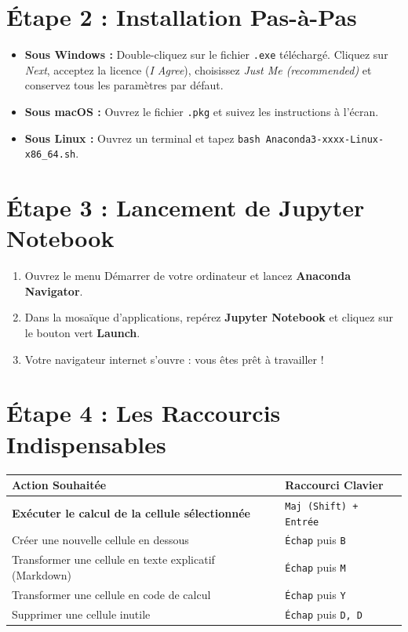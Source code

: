 \documentclass[11pt,a4paper]{article}
\begin{document}
\section*{\faCogs\hspace{0.5em}Étape 2 : Installation Pas-à-Pas}
\begin{itemize}
  \item \textbf{Sous Windows :} Double-cliquez sur le fichier \texttt{.exe} téléchargé. Cliquez sur \textit{Next}, acceptez la licence (\textit{I Agree}), choisissez \textit{Just Me (recommended)} et conservez tous les paramètres par défaut.
  \item \textbf{Sous macOS :} Ouvrez le fichier \texttt{.pkg} et suivez les instructions à l'écran.
  \item \textbf{Sous Linux :} Ouvrez un terminal et tapez \texttt{bash Anaconda3-xxxx-Linux-x86\_64.sh}.
\end{itemize}

\section*{\faRocket\hspace{0.5em}Étape 3 : Lancement de Jupyter Notebook}
\begin{enumerate}
  \item Ouvrez le menu Démarrer de votre ordinateur et lancez \textbf{Anaconda Navigator}.
  \item Dans la mosaïque d'applications, repérez \textbf{Jupyter Notebook} et cliquez sur le bouton vert \textbf{Launch}.
  \item Votre navigateur internet s'ouvre : vous êtes prêt à travailler !
\end{enumerate}

\section*{\faKeyboard\hspace{0.5em}Étape 4 : Les Raccourcis Indispensables}
\begin{center}
\begin{tabular}{ll}
  \toprule
  \textbf{Action Souhaitée} & \textbf{Raccourci Clavier} \\
  \midrule
  \textbf{Exécuter le calcul de la cellule sélectionnée} & \texttt{Maj (Shift) + Entrée} \\
  Créer une nouvelle cellule en dessous & \texttt{Échap} puis \texttt{B} \\
  Transformer une cellule en texte explicatif (Markdown) & \texttt{Échap} puis \texttt{M} \\
  Transformer une cellule en code de calcul & \texttt{Échap} puis \texttt{Y} \\
  Supprimer une cellule inutile & \texttt{Échap} puis \texttt{D, D} \\
  \bottomrule
\end{tabular}
\end{center}
\end{document}
